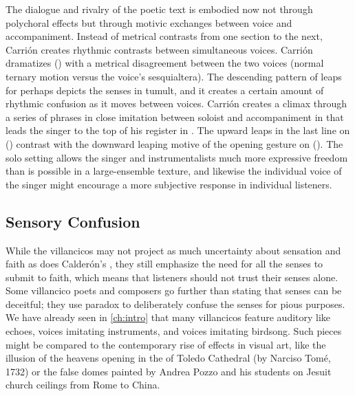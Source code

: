 The dialogue and rivalry of the poetic text is embodied now not through
polychoral effects but through motivic exchanges between voice and
accompaniment.
Instead of metrical contrasts from one section to the next, Carrión creates
rhythmic contrasts between simultaneous voices.
Carrión dramatizes  () with a metrical disagreement
between the two voices (normal ternary motion versus the voice's sesquialtera).
The descending pattern of leaps for  perhaps
depicts the senses in tumult, and it creates a certain amount of rhythmic
confusion as it moves between voices.
Carrión creates a climax through a series of phrases in close imitation between
soloist and accompaniment in  that leads the singer to the top
of his register in .
The upward leaps in the last line on  ()
contrast with the downward leaping motive of the opening gesture on
 ().
The solo setting allows the singer and instrumentalists much more expressive
freedom than is possible in a large-ensemble texture, and likewise the
individual voice of the singer might encourage a more subjective response in
individual listeners.

\subsection{Sensory Confusion}

While the  villancicos may not project as much
uncertainty about sensation and faith as does Calderón's , they still emphasize the need for all the senses to submit
to faith, which means that listeners should not trust their senses alone.
Some villancico poets and composers go further than stating that senses can be
deceitful; they use paradox to deliberately confuse the senses for pious
purposes.
We have already seen in \cref{ch:intro} that many villancicos feature auditory
 like echoes, voices imitating instruments, and voices
imitating birdsong.
Such pieces might be compared to the contemporary rise of 
effects in visual art, like the illusion of the heavens opening in the
 of Toledo Cathedral (by Narciso Tomé, 1732) or the false
domes painted by Andrea Pozzo and his students on Jesuit church ceilings from
Rome to China.%
    \Autocites
    []{GroveArt}
    [110]{Bailey:Art}

